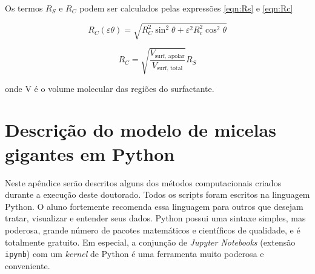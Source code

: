 \begin{apendicesenv}
	Os termos $R_S$ e $R_C$ podem ser calculados pelas expressões \ref{eqn:Rs} e \ref{eqn:Rc}
	
	\begin{equation}
	R_C(\varepsilon\theta) = \sqrt{R_C^2\sin^2\theta + \varepsilon^2R_c^2\cos^2\theta}
	\label{eqn:Rc}
	\end{equation}
	
	\begin{equation}
	R_C = \sqrt{\frac{V_{\text{surf, apolar}}}{V_{\text{surf, total}}}}R_S
	\label{eqn:Rs}
	\end{equation}
	
	\noindent onde V é o volume molecular das regiões do surfactante.
	
	
	\chapter{Descrição do modelo de micelas gigantes em Python}
	
	
		
		Neste apêndice serão descritos alguns dos métodos computacionais criados durante a execução deste doutorado. Todos os scripts foram escritos na linguagem Python. O aluno fortemente recomenda essa linguagem para outros que desejam tratar, visualizar e entender seus dados. Python possui uma sintaxe simples, mas poderosa, grande número de pacotes matemáticos e científicos de qualidade, e é totalmente gratuito. Em especial, a conjunção de \emph{Jupyter Notebooks} (extensão \texttt{ipynb}) com um \emph{kernel} de Python é uma ferramenta muito poderosa e conveniente.
		

\end{apendicesenv}
